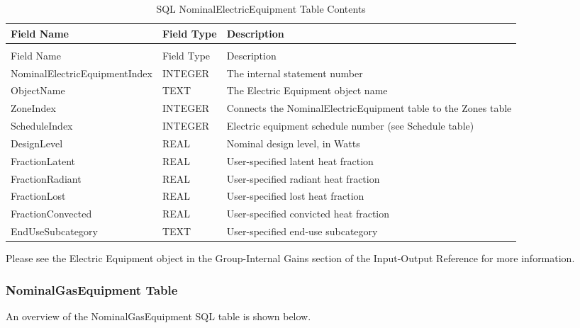 {\scriptsize
\begin{longtable}[c]{>{\raggedright}p{1.5in}>{\raggedright}p{1.5in}>{\raggedright}p{2.99in}}
\caption{SQL NominalElectricEquipment Table Contents \label{table:table-17.-sql-nominalelectricequipment-table}} \tabularnewline
\toprule 
Field Name & Field Type & Description \tabularnewline
\midrule
\endfirsthead

\caption[]{SQL NominalElectricEquipment Table Contents} \tabularnewline
\toprule 
Field Name & Field Type & Description \tabularnewline
\midrule
\endhead

Nominal\-Electric\-Equipment\-Index & INTEGER & The internal statement number \tabularnewline
ObjectName & TEXT & The Electric Equipment object name \tabularnewline
ZoneIndex & INTEGER & Connects the NominalElectricEquipment table to the Zones table \tabularnewline
ScheduleIndex & INTEGER & Electric equipment schedule number (see Schedule table) \tabularnewline
DesignLevel & REAL & Nominal design level, in Watts \tabularnewline
FractionLatent & REAL & User-specified latent heat fraction \tabularnewline
FractionRadiant & REAL & User-specified radiant heat fraction \tabularnewline
FractionLost & REAL & User-specified lost heat fraction \tabularnewline
FractionConvected & REAL & User-specified convicted heat fraction \tabularnewline
EndUseSubcategory & TEXT & User-specified end-use subcategory \tabularnewline
\bottomrule
\end{longtable}}

Please see the Electric Equipment object in the Group-Internal Gains section of the Input-Output Reference for more information.

\subsubsection{NominalGasEquipment Table}

An overview of the NominalGasEquipment SQL table is shown below.

